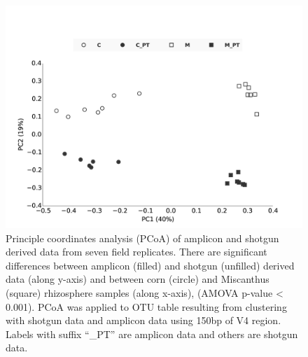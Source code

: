 \documentclass[]{msu-thesis}
\begin{document}
\begin{figure}[tbph!]
  \centering
  \includegraphics[width=1\textwidth]{figs/chap2_fig1}
  \caption[Ordination of amplicon and shotgun data from the same samples]{Principle coordinates analysis (PCoA) of amplicon and shotgun derived data from seven field replicates. There are significant differences between amplicon (filled) and shotgun (unfilled) derived data (along y-axis) and between corn (circle) and Miscanthus (square) rhizosphere samples (along x-axis), (AMOVA p-value < 0.001). PCoA was applied to OTU table resulting from clustering with shotgun data and amplicon data using 150bp of V4 region. Labels with suffix ``\_PT'' are amplicon data and others are shotgun data.}
  \label{fig:chap2Fig1}
\end{figure}
\end{document}
